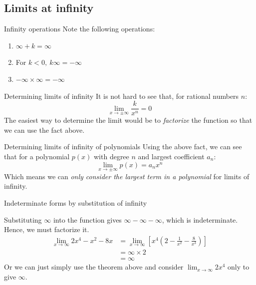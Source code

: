 \subsection{Limits at infinity}
\begin{theorem}
    {Infinity operations}
    Note the following operations:
    \begin{enumerate}
        \item $\infty + k=\infty$
        \item For $k<0,\ k\infty=-\infty$
        \item $-\infty\times\infty=-\infty$
    \end{enumerate}
\end{theorem}
\begin{knBox}
    {Determining limits of infinity}
    It is not hard to see that, for rational numbers $n$:
    \[\lim_{x\to\pm\infty}\frac{k}{x^n}=0\]
    The easiest way to determine the limit would be to \emph{factorize} the function so that we can use the fact above.
\end{knBox}
\begin{theorem}
    {Determining limits of infinity of polynomials}
    Using the above fact, we can see that for a polynomial $p(x)$ with degree $n$ and largest coefficient $a_n$:
    \[\lim_{x\to\pm\infty}p(x)=a_nx^n\]
    Which means we can \emph{only consider the largest term in a polynomial} for limits of infinity.
\end{theorem}
\begin{example}
    Indeterminate forms by substitution of infinity

    Substituting $\infty$ into the function gives $\infty-\infty-\infty$, which is indeterminate. Hence, we must factorize it.
    \begin{align*}
        \lim_{x\to\infty}2x^4-x^2-8x & =\lim_{x\to\infty}[x^4(2-\frac{1}{x^2}-\frac{8}{x^3})] \\
                                     & =\infty\times 2                                        \\
                                     & =\infty
    \end{align*}
    Or we can just simply use the theorem above and consider $\lim_{x\to\infty}2x^4$ only to give $\infty$.
\end{example}

